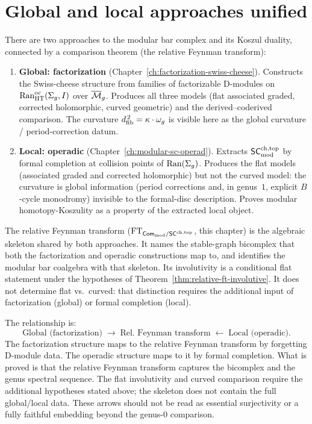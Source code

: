 \section{Global and local approaches unified}
\label{sec:three-routes}

\begin{remark}
\label{rem:three-routes-unified}
There are two approaches to the modular bar complex and its
Koszul duality, connected by a comparison theorem (the relative
Feynman transform):
\begin{enumerate}[label=\textup{(\roman*)}]
\item \textbf{Global: factorization}
 \textup{(}Chapter~\textup{\ref{ch:factorization-swiss-cheese}}\textup{)}.
 Constructs the Swiss-cheese structure from
 families of factorizable D-modules on
 $\operatorname{Ran}^{\mathrm{oc}}_{\mathrm{HT}}(\Sigma_g,I)$ over
 $\overline{\mathcal{M}}_g$. Produces all three models
 (flat associated graded, corrected holomorphic, curved
 geometric) and the derived--coderived comparison. The
 curvature $d_{\mathrm{fib}}^{\,2} = \kappa \cdot \omega_g$ is visible
 here as the global curvature / period-correction datum.
\item \textbf{Local: operadic}
 \textup{(}Chapter~\textup{\ref{ch:modular-sc-operad}}\textup{)}.
 Extracts $\mathsf{SC}^{\mathrm{ch,top}}_{\mathrm{mod}}$
 by formal completion at collision points of $\operatorname{Ran}(\Sigma_g)$.
 Produces the flat models (associated graded and corrected
 holomorphic) but not the curved model: the curvature is
 global information (period corrections and, in genus~$1$,
 explicit $B$-cycle monodromy) invisible to the formal-disc
 description. Proves modular
 homotopy-Koszulity as a property of the extracted local
 object.
\end{enumerate}

\noindent
The relative Feynman transform
($\mathrm{FT}_{\mathsf{Com}_{\mathrm{mod}} / \mathsf{SC}^{\mathrm{ch,top}}}$, this chapter)
is the algebraic skeleton shared by both approaches. It names
the stable-graph bicomplex that both the factorization and
operadic constructions map to, and identifies the modular bar
coalgebra with that skeleton. Its involutivity is a conditional
flat statement under the hypotheses of
Theorem~\ref{thm:relative-ft-involutive}. It does not determine
flat vs.\ curved: that distinction requires the additional input
of factorization (global) or formal completion (local).

\noindent
The relationship is:
\[
\text{Global (factorization)}
\;\longrightarrow\;
\text{Rel.\ Feynman transform}
\;\longleftarrow\;
\text{Local (operadic)}.
\]
The factorization structure maps to the relative Feynman
transform by forgetting D-module data. The operadic structure
maps to it by formal completion. What is proved is that the
relative Feynman transform captures the bicomplex and the genus
spectral sequence. The flat involutivity and curved comparison
require the additional hypotheses stated above; the skeleton does
not contain the full global/local data.
These arrows should not be read as essential surjectivity or a
fully faithful embedding beyond the genus-$0$ comparison.


\end{remark}
